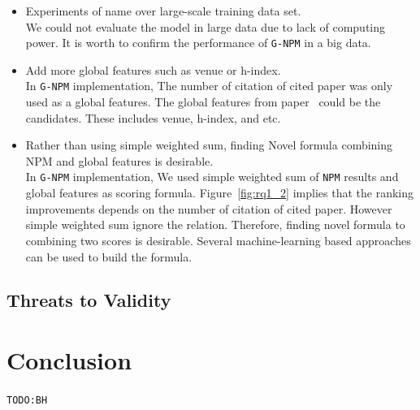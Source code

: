 \documentclass{llncs}
\newcommand{\name}{\texttt{G-NPM}\xspace}
\newcommand{\npm}{\texttt{NPM}\xspace}
\newcommand{\todo}[1]{\texttt{\color{red}TODO:#1}}
\begin{document}
\begin{itemize}

\item Experiments of name over large-scale training data set.\\
We could not evaluate the model in large data due to lack of computing power.
It is worth to confirm the performance of \name in a big data.\\

\item Add more global features such as venue or h-index.\\
In \name implementation, The number of citation of cited paper was only used as a global features. The global features from paper~\cite{Bethard:2010:ICL:1871437.1871517} could be the candidates. These includes venue, h-index, and etc.\\

\item Rather than using simple weighted sum, finding Novel formula combining NPM and global features is desirable.\\
In \name implementation, We used simple weighted sum of \npm results and global features as scoring formula. Figure~\ref{fig:rq1_2} implies that the ranking improvements depends on the number of citation of cited paper. However simple weighted sum ignore the relation. Therefore, finding novel formula to combining two scores is desirable. Several machine-learning based approaches can be used to build the formula.

\end{itemize}

\subsection{Threats to Validity}


\section{Conclusion}
\label{sec:Conclusion}
\todo{BH}




\end{document}
